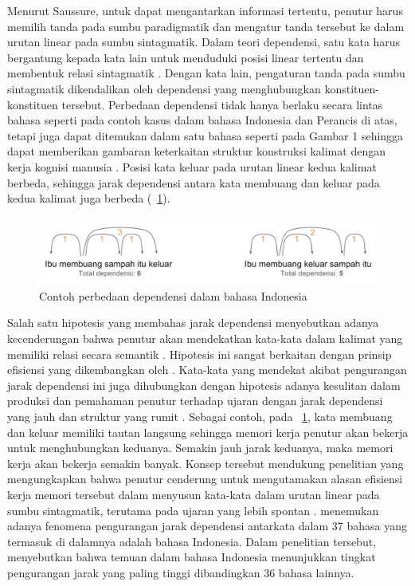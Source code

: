 Menurut Saussure, untuk dapat mengantarkan informasi tertentu, penutur harus memilih tanda pada sumbu paradigmatik dan mengatur tanda tersebut ke dalam urutan linear pada sumbu sintagmatik. Dalam teori dependensi, satu kata harus bergantung kepada kata lain untuk menduduki posisi linear tertentu dan membentuk relasi sintagmatik \citep{tesniere1959elements}. Dengan kata lain, pengaturan tanda pada sumbu sintagmatik dikendalikan oleh dependensi yang menghubungkan konstituen-konstituen tersebut. Perbedaan dependensi tidak hanya berlaku secara lintas bahasa seperti pada contoh kasus dalam bahasa Indonesia dan Perancis di atas, tetapi juga dapat ditemukan dalam satu bahasa seperti pada Gambar 1 sehingga dapat memberikan gambaran keterkaitan struktur konstruksi kalimat dengan kerja kognisi manusia \citep{gibson2000dependency}. Posisi kata keluar pada urutan linear kedua kalimat berbeda, sehingga jarak dependensi antara kata membuang dan keluar pada kedua kalimat juga berbeda (\pic~\ref{fig:contoh-dependensi}). 
\begin{figure}
	\centering \includegraphics[width=1
	\textwidth] {pics/contoh-dependensi.png} \caption{Contoh perbedaan dependensi dalam bahasa Indonesia} 
\label{fig:contoh-dependensi} \end{figure}

Salah satu hipotesis yang membahas jarak dependensi menyebutkan adanya kecenderungan bahwa penutur akan mendekatkan kata-kata dalam kalimat yang memiliki relasi secara semantik \citep{futrell2015large}. Hipotesis ini sangat berkaitan dengan prinsip efisiensi yang dikembangkan oleh \cite{hawkins2004efficiency}. Kata-kata yang mendekat akibat pengurangan jarak dependensi ini juga dihubungkan dengan hipotesis adanya kesulitan dalam produksi dan pemahaman penutur terhadap ujaran dengan jarak dependensi yang jauh dan struktur yang rumit \citealp{hawkins2004efficiency, dillon2011structured}. Sebagai contoh, pada \pic~\ref{fig:contoh-dependensi}, kata membuang dan keluar memiliki tautan langsung sehingga memori kerja penutur akan bekerja untuk menghubungkan keduanya. Semakin jauh jarak keduanya, maka memori kerja akan bekerja semakin banyak. Konsep tersebut mendukung penelitian \cite{jaeger2006redundancy} yang mengungkapkan bahwa penutur cenderung untuk mengutamakan alasan efisiensi kerja memori tersebut dalam menyusun kata-kata dalam urutan linear pada sumbu sintagmatik, terutama pada ujaran yang lebih spontan \citep{jaeger2006redundancy}. \cite{futrell2015large} menemukan adanya fenomena pengurangan jarak dependensi antarkata dalam 37 bahasa yang termasuk di dalamnya adalah bahasa Indonesia. Dalam penelitian tersebut, \cite{futrell2015large} menyebutkan bahwa temuan dalam bahasa Indonesia menunjukkan tingkat pengurangan jarak yang paling tinggi dibandingkan 36 bahasa lainnya. 

